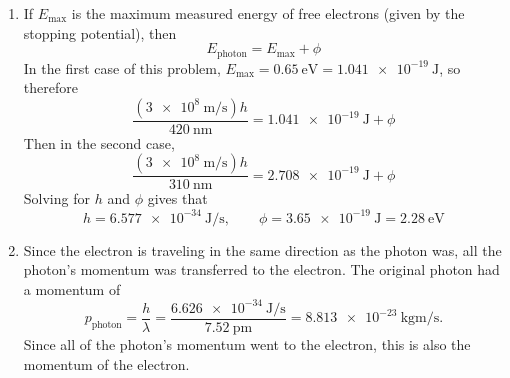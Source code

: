 \documentclass[fleqn]{article}[12pt]
\begin{document}
\begin{enumerate}
\begin{enumerate}
        \item The number of photons output per second is
        \begin{equation*}
            \si{\text{N}/\s} = \frac{\SI{41.25}{\watt}}{\SI{1.43e-19}{\joule}} = \SI{2.88e20}{\s^{-1}}
        \end{equation*}
        Then the area of this $\SI{1}{\m}$ sphere is
        \begin{equation*}
            A = 4\pi r^2 = 4 \pi
        \end{equation*}
        and the area of the square is $\SI{0.01}{\m^2}$. Thus the number of photons per second hitting this paper is
        \begin{equation*}
            \frac{\SI{0.01}{\m^2}}{\SI{4\pi}{\m^2}}\SI{2.88e20}{\s^{-1}} = \SI{2.292e17}{s^{-1}}
        \end{equation*}
    \end{enumerate}

    \item If $E_{\text{max}}$ is the maximum measured energy of free electrons (given by the stopping potential), then
    \begin{equation*}
        E_{\text{photon}} = E_{\text{max}} + \phi
    \end{equation*}
    In the first case of this problem, $E_{\text{max}} = \SI{0.65}{\eV} = \SI{1.041e-19}{\joule}$, so therefore
    \begin{equation*}
        \frac{(\SI{3e8}{\m/\s})h}{\SI{420}{\nm}} = \SI{1.041e-19}{\joule} + \phi
    \end{equation*}
    Then in the second case,
    \begin{equation*}
        \frac{(\SI{3e8}{\m/\s})h}{\SI{310}{\nm}} = \SI{2.708e-19}{\joule} + \phi
    \end{equation*}
    Solving for $h$ and $\phi$ gives that
    \begin{equation*}
        h = \SI{6.577e-34}{\joule/\s}, \qquad \phi = \SI{3.65e-19}{\joule} = \SI{2.28}{\eV}
    \end{equation*}

    \item Since the electron is traveling in the same direction as the photon was, all the photon's momentum was transferred to the electron. The original photon had a momentum of
    \begin{equation*}
        p_{\text{photon}} = \frac{h}{\lambda} = \frac{\SI{6.626e-34}{\joule/\s}}{\SI{7.52}{\pm}} = \SI{8.813e-23}{\kg\m/\s}.
    \end{equation*}
    Since all of the photon's momentum went to the electron, this is also the momentum of the electron. 

\end{enumerate}
\end{document}
